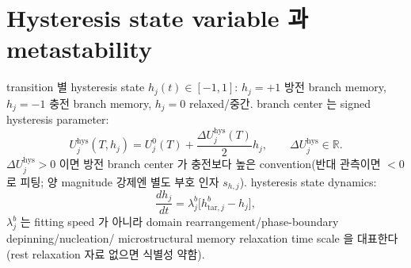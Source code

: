 \documentclass[11pt,a4paper]{article}
\newcommand{\hys}{\mathrm{hys}}
\newcommand{\tar}{\mathrm{tar}}
\begin{document}
\section{Hysteresis state variable 과 metastability}\label{sec:ch5_hstate}
transition 별 hysteresis state $h_j(t)\in[-1,1]$: $h_j=+1$ 방전 branch memory, $h_j=-1$ 충전 branch memory,
$h_j=0$ relaxed/중간. branch center 는 signed hysteresis parameter:
\begin{equation}
U_j^\hys(T,h_j)=U_j^0(T)+\frac{\Delta U_j^\hys(T)}{2}h_j,\qquad \Delta U_j^\hys\in\mathbb R.
\label{eq:ch5_hys_center}
\end{equation}
$\Delta U_j^\hys>0$ 이면 방전 branch center 가 충전보다 높은 convention(반대 관측이면 $<0$ 로 피팅; 양
magnitude 강제엔 별도 부호 인자 $s_{h,j}$). hysteresis state dynamics:
\begin{equation}
\frac{dh_j}{dt}=\lambda_j^b\big[h_{\tar,j}^b-h_j\big],
\label{eq:ch5_h_dyn}
\end{equation}
$\lambda_j^b$ 는 fitting speed 가 아니라 domain rearrangement/phase-boundary depinning/nucleation/
microstructural memory relaxation time scale 을 대표한다(rest relaxation 자료 없으면 식별성 약함).

\end{document}
